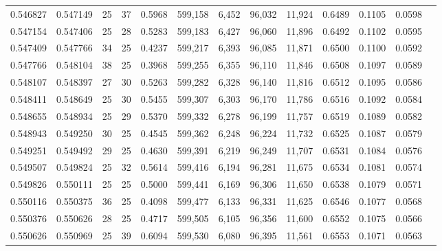 \begin{tabular}{rrrrrrrrrrrrr}
0.546827 & 0.547149 &    25 &  37 &                                     0.5968 & 599,158 &   6,452 &  96,032 &  11,924 & 0.6489 & 0.1105 & 0.0598 \\
0.547154 & 0.547406 &    25 &  28 &                                     0.5283 & 599,183 &   6,427 &  96,060 &  11,896 & 0.6492 & 0.1102 & 0.0595 \\
0.547409 & 0.547766 &    34 &  25 &                                     0.4237 & 599,217 &   6,393 &  96,085 &  11,871 & 0.6500 & 0.1100 & 0.0592 \\
0.547766 & 0.548104 &    38 &  25 &                                     0.3968 & 599,255 &   6,355 &  96,110 &  11,846 & 0.6508 & 0.1097 & 0.0589 \\
0.548107 & 0.548397 &    27 &  30 &                                     0.5263 & 599,282 &   6,328 &  96,140 &  11,816 & 0.6512 & 0.1095 & 0.0586 \\
0.548411 & 0.548649 &    25 &  30 &                                     0.5455 & 599,307 &   6,303 &  96,170 &  11,786 & 0.6516 & 0.1092 & 0.0584 \\
0.548655 & 0.548934 &    25 &  29 &                                     0.5370 & 599,332 &   6,278 &  96,199 &  11,757 & 0.6519 & 0.1089 & 0.0582 \\
0.548943 & 0.549250 &    30 &  25 &                                     0.4545 & 599,362 &   6,248 &  96,224 &  11,732 & 0.6525 & 0.1087 & 0.0579 \\
0.549251 & 0.549492 &    29 &  25 &                                     0.4630 & 599,391 &   6,219 &  96,249 &  11,707 & 0.6531 & 0.1084 & 0.0576 \\
0.549507 & 0.549824 &    25 &  32 &                                     0.5614 & 599,416 &   6,194 &  96,281 &  11,675 & 0.6534 & 0.1081 & 0.0574 \\
0.549826 & 0.550111 &    25 &  25 &                                     0.5000 & 599,441 &   6,169 &  96,306 &  11,650 & 0.6538 & 0.1079 & 0.0571 \\
0.550116 & 0.550375 &    36 &  25 &                                     0.4098 & 599,477 &   6,133 &  96,331 &  11,625 & 0.6546 & 0.1077 & 0.0568 \\
0.550376 & 0.550626 &    28 &  25 &                                     0.4717 & 599,505 &   6,105 &  96,356 &  11,600 & 0.6552 & 0.1075 & 0.0566 \\
0.550626 & 0.550969 &    25 &  39 &                                     0.6094 & 599,530 &   6,080 &  96,395 &  11,561 & 0.6553 & 0.1071 & 0.0563 \\

\end{tabular}
